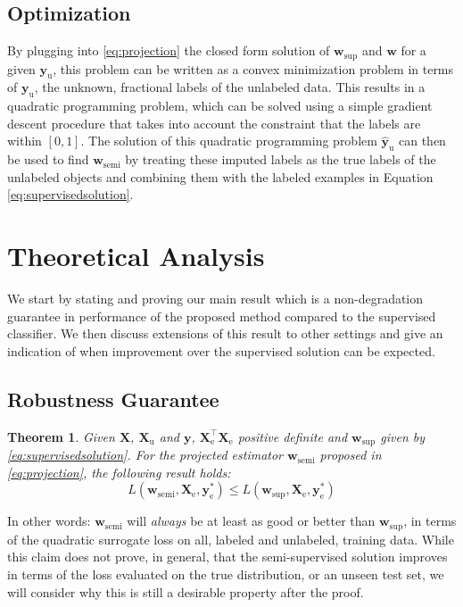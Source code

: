 \documentclass[twoside]{memoir}\usepackage[]{graphicx}\usepackage{xcolor}
\newcommand{\Xe}{\mathbf{X}_\mathrm{e}  }
\renewcommand{\vec}{\mathbf}
\newtheorem{theorem}{Theorem}
\begin{document}
\subsection{Optimization}
By plugging into \eqref{eq:projection} the closed form solution of $\vec{w}_\text{sup}$ and $\vec{w}$  for a given $\vec{y}_\text{u}$, this problem can be written as a convex minimization problem in terms of $\vec{y}_\text{u}$, the unknown, fractional labels of the unlabeled data. This results in a quadratic programming problem, which can be solved using a simple gradient descent procedure that takes into account the constraint that the labels are within $[0,1]$. The solution of this quadratic programming problem $\vec{\hat{y}}_\text{u}$ can then be used to find  $\vec{w}_\text{semi}$ by treating these imputed labels as the true labels of the unlabeled objects and combining them with the labeled examples in Equation \eqref{eq:supervisedsolution}.

\section{Theoretical Analysis}
\label{section:theory}

We start by stating and proving our main result which is a non-degradation guarantee in performance of the proposed method compared to the supervised classifier. We then discuss extensions of this result to other settings and give an indication of when improvement over the supervised solution can be expected.

\subsection{Robustness Guarantee}
\begin{theorem}
\label{th:robustness}
Given $\vec{X}$, $\vec{X}_\mathrm{u}$ and $\vec{y}$, $\Xe^\top \Xe$ positive definite and $\vec{w}_\mathrm{sup}$ given by \eqref{eq:supervisedsolution}. For the projected estimator $\vec{w}_\mathrm{semi}$ proposed in \eqref{eq:projection}, the following result holds:
$$L(\vec{w}_\mathrm{semi},\Xe,\vec{y}_\mathrm{e}^{\ast}) \leq L(\vec{w}_\mathrm{sup},\Xe,\vec{y}_\mathrm{e}^{\ast}) $$
\end{theorem}
In other words: $\vec{w}_\text{semi}$ will \emph{always} be at least as good or better than $\vec{w}_\text{sup}$, in terms of the quadratic surrogate loss on all, labeled and unlabeled, training data. While this claim does not prove, in general, that the semi-supervised solution improves in terms of the loss evaluated on the true distribution, or an unseen test set, we will consider why this is still a desirable property after the proof.
\end{document}
